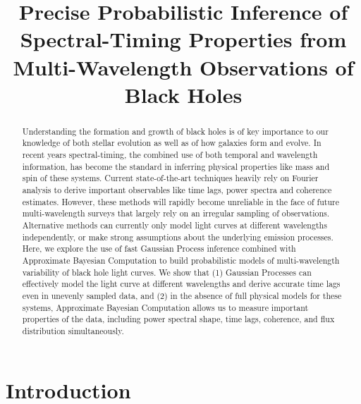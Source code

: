 \documentclass[12pt]{emulateapj}
\begin{document}
\title{Precise Probabilistic Inference of Spectral-Timing Properties from Multi-Wavelength Observations of Black Holes}

 

\begin{abstract}
Understanding the formation and growth of black holes is of key importance to our knowledge of both stellar evolution as 
well as of how galaxies form and evolve. In recent years spectral-timing, the combined use of both temporal and wavelength information,
has become the standard in inferring physical properties like mass and spin of these systems. Current state-of-the-art techniques 
heavily rely on Fourier analysis to derive important observables like time lags, power spectra and coherence estimates. However, these 
methods will rapidly become unreliable in the face of future multi-wavelength surveys that largely rely on an irregular sampling of observations.
Alternative methods can currently only model light curves at different wavelengths independently, or make strong assumptions about the 
underlying emission processes. Here, we explore the use of fast Gaussian Process inference combined with Approximate Bayesian 
Computation to build probabilistic models of multi-wavelength variability of black hole light curves. We show that (1) Gaussian Processes 
can effectively model the light curve at different wavelengths and derive accurate time lags even in unevenly sampled data, and (2) in 
the absence of full physical models for these systems, Approximate Bayesian Computation allows us to measure important properties of the 
data, including power spectral shape, time lags, coherence, and flux distribution simultaneously.

\end{abstract}


\section{Introduction}



\end{document}
